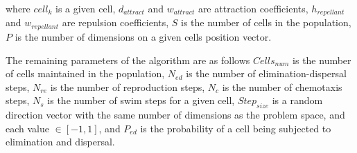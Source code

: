 where $cell_k$ is a given cell, $d_{attract}$ and $w_{attract}$ are attraction coefficients, $h_{repellant}$ and $w_{repellant}$ are repulsion coefficients, $S$ is the number of cells in the population, $P$ is the number of dimensions on a given cells position vector.

The remaining parameters of the algorithm are as follows $Cells_{num}$ is the number of cells maintained in the population, $N_{ed}$ is the number of elimination-dispersal steps, $N_{re}$ is the number of reproduction steps, $N_{c}$ is the number of chemotaxis steps, $N_{s}$ is the number of swim steps for a given cell, $Step_{size}$ is a random direction vector with the same number of dimensions as the problem space, and each value $\in [-1,1]$, and $P_{ed}$ is the probability of a cell being subjected to elimination and dispersal. 

